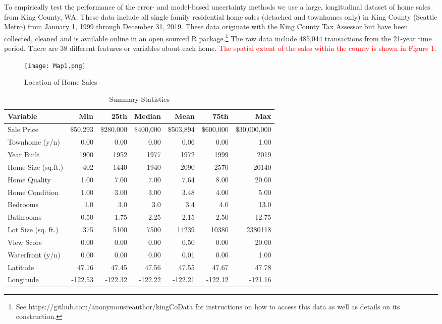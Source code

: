 \documentclass[colTwo]{anon}
\theoremstyle{definition}
\begin{document}
To empirically test the performance of the error- and model-based uncertainty methods we use a large, longitudinal dataset of home sales from King County, WA.  These data include all single family residential home sales (detached and townhomes only) in King County (Seattle Metro) from January 1, 1999 through December 31, 2019. These data originate with the King County Tax Assessor but have been collected, cleaned and is available online in an open sourced R package.\footnote{See https://github.com/anonymousreauthor/kingCoData for instructions on how to access this data as well as details on its construction.} The raw data include 485,044 transactions from the 21-year time period.  There are 38 different features or variables about each home. \textcolor{red}{The spatial extent of the sales within the county is shown in Figure 1.}

\begin{figure*}[h!]
\centering
\texttt{[image: Map1.png]}
\caption{Location of Home Sales}
\label{fig:calibsens}
\end{figure*}

\begin{table*}[h!]
\centering
\begin{tabular}{l|r|r|r|r|r|r}
\hline
\textbf{Variable} & \textbf{Min} & \textbf{25th} & \textbf{Median} & \textbf{Mean} & \textbf{75th} & \textbf{Max}\\
\hline
Sale Price & \$50,293 & \$280,000 & \$400,000 & \$503,894 & \$600,000 & \$30,000,000\\
Townhome (y/n) & 0.00 & 0.00 & 0.00 & 0.06 & 0.00 & 1.00 \\
Year Built & 1900 & 1952 & 1977 & 1972 & 1999 & 2019\\
Home Size (sq.ft.) & 402 & 1440 & 1940 & 2090 & 2570 & 20140\\
Home Quality & 1.00 & 7.00 & 7.00 & 7.64 & 8.00 & 20.00\\
Home Condition & 1.00 & 3.00 & 3.00 & 3.48 & 4.00 & 5.00\\
Bedrooms & 1.0 & 3.0 & 3.0 & 3.4 & 4.0 & 13.0\\
Bathrooms & 0.50 & 1.75 & 2.25 & 2.15 & 2.50 & 12.75\\
Lot Size (sq. ft.) & 375 & 5100 & 7500 & 14239 & 10380 & 2380118\\
View Score & 0.00 & 0.00 & 0.00 & 0.50 & 0.00 & 20.00\\
Waterfront (y/n) & 0.00 & 0.00 & 0.00 & 0.01 & 0.00 & 1.00\\
Latitude & 47.16 & 47.45 & 47.56 & 47.55 & 47.67 & 47.78\\
Longitude & -122.53 & -122.32 & -122.22 & -122.21 & -122.12 & -121.16\\
\hline
\end{tabular}
\caption{Summary Statistics}
\label{table:3}
\end{table*}
\end{document}
